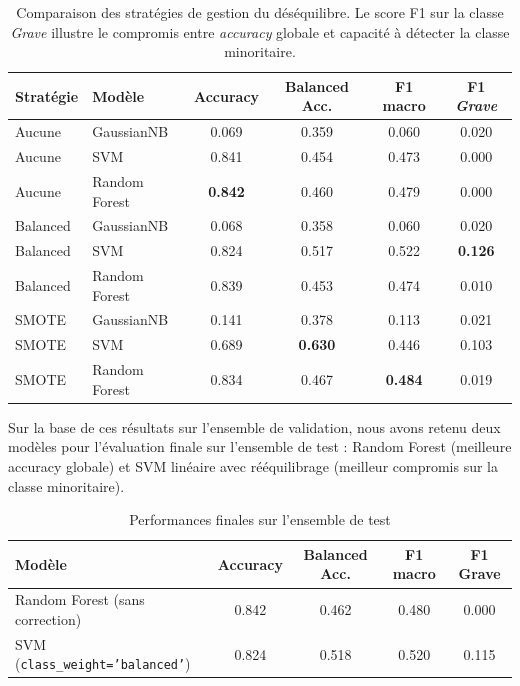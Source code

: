 \documentclass[11pt]{article}
\begin{document}
\begin{table}[H]
\centering
\begin{tabular}{llcccc}
\hline
Stratégie & Modèle & Accuracy & Balanced Acc. & F1 macro & F1 \textit{Grave} \\
\hline
Aucune   & GaussianNB    & 0.069 & 0.359 & 0.060 & 0.020 \\
Aucune   & SVM           & 0.841 & 0.454 & 0.473 & 0.000 \\
Aucune   & Random Forest & \textbf{0.842} & 0.460 & 0.479 & 0.000 \\
\hline
Balanced & GaussianNB    & 0.068 & 0.358 & 0.060 & 0.020 \\
Balanced & SVM           & 0.824 & 0.517 & 0.522 & \textbf{0.126} \\
Balanced & Random Forest & 0.839 & 0.453 & 0.474 & 0.010 \\
\hline
SMOTE    & GaussianNB    & 0.141 & 0.378 & 0.113 & 0.021 \\
SMOTE    & SVM           & 0.689 & \textbf{0.630 }& 0.446 & 0.103 \\
SMOTE    & Random Forest & 0.834 & 0.467 & \textbf{0.484 }& 0.019 \\
\hline
\end{tabular}
\caption{Comparaison des stratégies de gestion du déséquilibre. 
Le score F1 sur la classe \textit{Grave} illustre le compromis entre 
\textit{accuracy} globale et capacité à détecter la classe minoritaire.}
\label{tab:strategies}
\end{table}

Sur la base de ces résultats sur l'ensemble de validation, nous avons retenu deux modèles pour l'évaluation finale sur l'ensemble de test : Random Forest (meilleure accuracy globale) et SVM linéaire avec rééquilibrage (meilleur compromis sur la classe minoritaire).

\begin{table}[H]
\centering
\begin{tabular}{lcccc}
\hline
Modèle & Accuracy & Balanced Acc. & F1 macro & F1 Grave \\
\hline
Random Forest (sans correction)         & 0.842 & 0.462 & 0.480 & 0.000 \\
SVM (\texttt{class\_weight='balanced'}) & 0.824 & 0.518 & 0.520 & 0.115 \\
\hline
\end{tabular}
\caption{Performances finales sur l'ensemble de test}
\label{tab:test}
\end{table}
\end{document}
